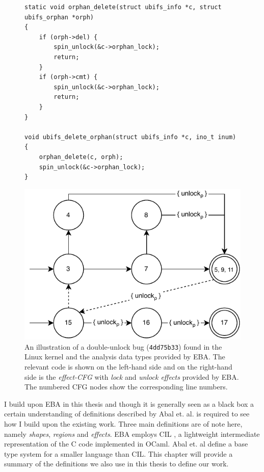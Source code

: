 \begin{figure}[H]
\centering
\begin{minipage}{0.4\textwidth}
    \begin{verbatim}
static void orphan_delete(struct ubifs_info *c, struct ubifs_orphan *orph)
{
	if (orph->del) {
		spin_unlock(&c->orphan_lock);
		return;
	}
	if (orph->cmt) {
		spin_unlock(&c->orphan_lock);
		return;
	}
}

void ubifs_delete_orphan(struct ubifs_info *c, ino_t inum)
{
	orphan_delete(c, orph);
	spin_unlock(&c->orphan_lock);
}
\end{verbatim}
\end{minipage}
\hspace*{0.05\textwidth}
\begin{minipage}{0.45\textwidth}
    \includegraphics[width=\textwidth]{background/figures/annotated-cfg}
\end{minipage}
\caption{An illustration of a double-unlock bug (\texttt{4dd75b33}) found in the Linux kernel and the analysis data types provided by EBA. The relevant code is shown on the left-hand side and on the right-hand side is the \textit{effect-CFG} with \textit{lock} and \textit{unlock effects} provided by EBA. The numbered CFG nodes show the corresponding line numbers.}
\label{initial-bug-visualisation}
\end{figure}

\newpar I build upon EBA in this thesis and though it is generally seen as a black box a certain understanding of definitions described by Abal et. al. \cite{Abal2017EffectiveBF} is required to see how I build upon the existing work. Three main definitions are of note here, namely \textit{shapes}, \textit{regions} and \textit{effects}. EBA employs CIL \cite{cil}, a lightweight intermediate representation of the C code implemented in OCaml. Abal et. al define a base type system for a smaller language than CIL. This chapter will provide a summary of the definitions we also use in this thesis to define our work. 

